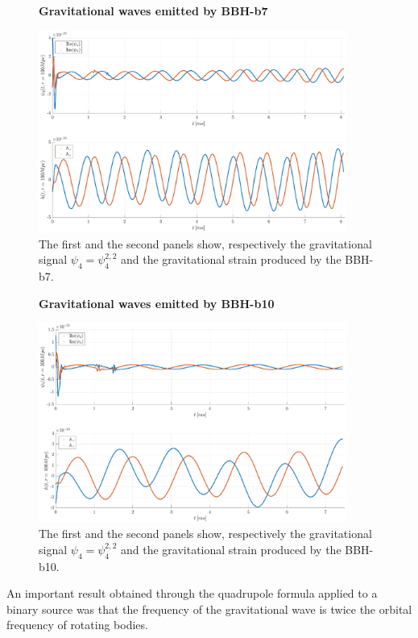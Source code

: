    \begin{figure}[H]
\centering
    \textbf{Gravitational waves emitted by BBH-b7}\par\medskip
\centering
\includegraphics[width=0.9\textwidth]{numerical_evolution/gw_b7.eps}
\caption{The first and the second panels show, respectively the gravitational signal $\psi_4=\psi_4 ^{2,2}$ and the gravitational strain produced by the BBH-b7.}   
   \label{gw_b7}
   \end{figure}
      \begin{figure}[H]
\centering
    \textbf{Gravitational waves emitted by BBH-b10}\par\medskip
\centering   
\includegraphics[width=0.9\textwidth]{numerical_evolution/gw_b10.eps}
\caption{The first and the second panels show, respectively the gravitational signal $\psi_4=\psi_4 ^{2,2}$ and the gravitational strain produced by the BBH-b10.}
\label{gw_b10}
\end{figure}
An important result obtained through the quadrupole formula applied to a binary source was that the frequency of the gravitational wave is twice the orbital frequency of rotating bodies.
